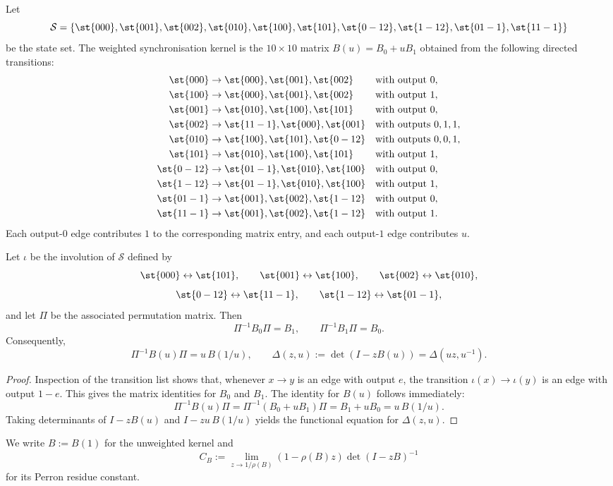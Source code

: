 \begin{definition}\label{def:sync-kernel}
Let
\[
  \mathcal S=
  \{\st{000},\st{001},\st{002},\st{010},\st{100},\st{101},
    \st{0-12},\st{1-12},\st{01-1},\st{11-1}\}
\]
be the state set. The weighted synchronisation kernel is the
\(10\times 10\) matrix \(B(u)=B_0+uB_1\) obtained from the following
directed transitions:
\begin{align*}
  \st{000}&\to \st{000},\st{001},\st{002}
    &&\text{with output }0,\\
  \st{100}&\to \st{000},\st{001},\st{002}
    &&\text{with output }1,\\
  \st{001}&\to \st{010},\st{100},\st{101}
    &&\text{with output }0,\\
  \st{002}&\to \st{11-1},\st{000},\st{001}
    &&\text{with outputs }0,1,1,\\
  \st{010}&\to \st{100},\st{101},\st{0-12}
    &&\text{with outputs }0,0,1,\\
  \st{101}&\to \st{010},\st{100},\st{101}
    &&\text{with output }1,\\
  \st{0-12}&\to \st{01-1},\st{010},\st{100}
    &&\text{with output }0,\\
  \st{1-12}&\to \st{01-1},\st{010},\st{100}
    &&\text{with output }1,\\
  \st{01-1}&\to \st{001},\st{002},\st{1-12}
    &&\text{with output }0,\\
  \st{11-1}&\to \st{001},\st{002},\st{1-12}
    &&\text{with output }1.
\end{align*}
Each output-\(0\) edge contributes \(1\) to the corresponding matrix
entry, and each output-\(1\) edge contributes \(u\).
\end{definition}

\begin{proposition}\label{prop:sync-self-duality}
Let \(\iota\) be the involution of \(\mathcal S\) defined by
\[
  \st{000}\leftrightarrow\st{101},\qquad
  \st{001}\leftrightarrow\st{100},\qquad
  \st{002}\leftrightarrow\st{010},
\]
\[
  \st{0-12}\leftrightarrow\st{11-1},\qquad
  \st{1-12}\leftrightarrow\st{01-1},
\]
and let \(\Pi\) be the associated permutation matrix. Then
\[
  \Pi^{-1}B_0\Pi=B_1,
  \qquad
  \Pi^{-1}B_1\Pi=B_0.
\]
Consequently,
\[
  \Pi^{-1}B(u)\Pi=u\,B(1/u),
  \qquad
  \Delta(z,u):=\det(I-zB(u))=\Delta(uz,u^{-1}).
\]
\end{proposition}

\begin{proof}
Inspection of the transition list shows that, whenever
\(x\to y\) is an edge with output \(e\), the transition
\(\iota(x)\to\iota(y)\) is an edge with output \(1-e\). This gives the
matrix identities for \(B_0\) and \(B_1\). The identity for \(B(u)\)
follows immediately:
\[
  \Pi^{-1}B(u)\Pi
  =\Pi^{-1}(B_0+uB_1)\Pi
  =B_1+uB_0
  =u\,B(1/u).
\]
Taking determinants of \(I-zB(u)\) and \(I-zu\,B(1/u)\) yields the
functional equation for \(\Delta(z,u)\).
\end{proof}

\begin{definition}
We write \(B:=B(1)\) for the unweighted kernel and
\[
  C_B:=\lim_{z\to 1/\rho(B)}(1-\rho(B)z)\det(I-zB)^{-1}
\]
for its Perron residue constant.
\end{definition}
